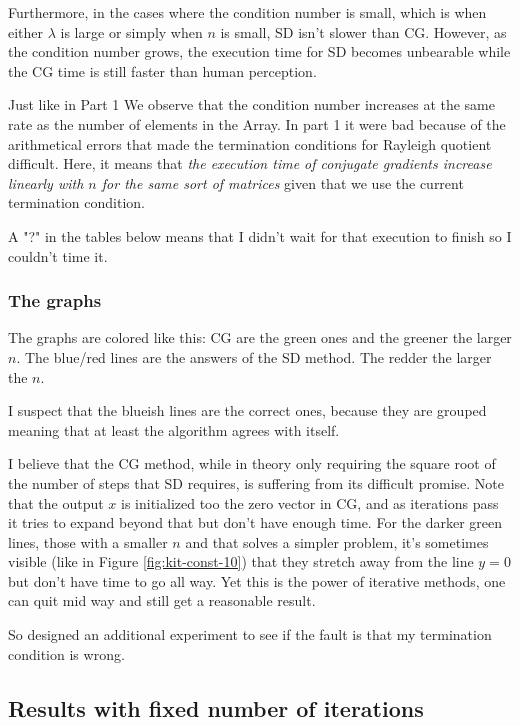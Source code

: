 \documentclass[a4paper,11pt]{article}
\begin{document}
Furthermore, in the cases where the condition number is small, which is when
either $\lambda$ is large or simply when $n$ is small, SD isn't slower than CG.
However, as the condition number grows, the execution time for SD becomes
unbearable while the CG time is still faster than human perception.

Just like in Part 1 We observe that the condition number increases at the same
rate as the number of elements in the Array. In part 1 it were bad because of
the arithmetical errors that made the termination conditions for Rayleigh
quotient difficult. Here, it means that \emph{the execution time of conjugate
gradients increase linearly with $n$ for the same sort of matrices} given that
we use the current termination condition.

A "?" in the tables below means that I didn't wait for that execution to finish
so I couldn't time it.

\subsubsection{The graphs}

The graphs are colored like this: CG are the green ones and the greener the
larger $n$. The blue/red lines are the answers of the SD method. The redder the
larger the $n$.

I suspect that the blueish lines are the correct ones, because they are grouped
meaning that at least the algorithm agrees with itself.

I believe that the CG method, while in theory only requiring the square root of
the number of steps that SD requires, is suffering from its difficult promise.
Note that the output $x$ is initialized too the zero vector in CG, and as
iterations pass it tries to expand beyond that but don't have enough time. For
the darker green lines, those with a smaller $n$ and that solves a simpler
problem, it's sometimes visible (like in Figure \ref{fig:kit-const-10}) that they
stretch away from the line $y=0$ but don't have time to go all way. Yet this is
the power of iterative methods, one can quit mid way and still get a reasonable
result.

So designed an additional experiment to see if the fault is that my termination
condition is wrong.

\subsection{Results with fixed number of iterations}
\end{document}
